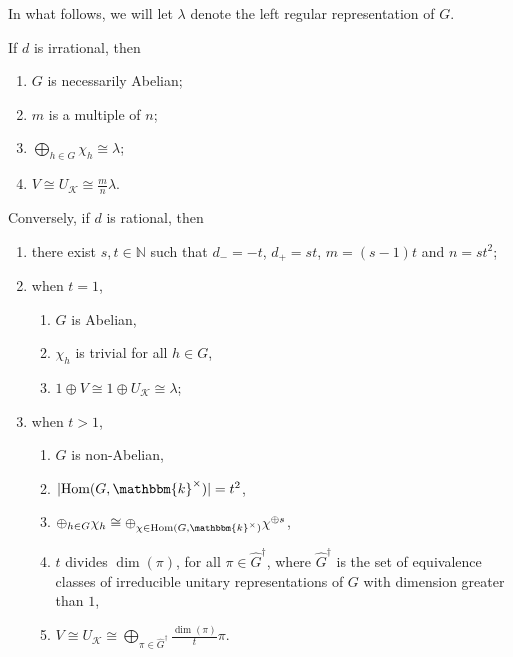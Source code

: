 \noindent In what follows, we will let $\lambda$ denote the left regular representation of $G$.\\

\noindent\begin{theorem}\label{GroupProperties} If ${d}$ is irrational, then
\begin{enumerate}[label=\textup{(\roman*).}, ref=\textup{(\roman*)}, leftmargin=4\parindent]
\item $G$ is necessarily Abelian;
\item $m$ is a multiple of $n$;
\item $\bigoplus_{h \in G} \chi_h \cong \lambda$;
\item $V \cong U_\mathcal{K} \cong \frac{m}{n}\lambda$.
\end{enumerate}
\noindent Conversely, if ${d}$ is rational, then
\begin{enumerate}[label=\textup{(\roman*).}, ref=\textup{(\roman*)}, leftmargin=4\parindent]
\item there exist $s, t \in \mathbb{N}$ such that $d_- = -t$, $d_+ = st$, $m = (s - 1)t$ and $n = st^2$;
\item when $t = 1$,
\begin{enumerate}[label=$\bullet$, leftmargin=4\parindent]
\item $G$ is Abelian,
\item $\chi_h$ is trivial for all $h \in G$,
\item $1 \oplus V \cong 1 \oplus U_\mathcal{K} \cong \lambda$;
\end{enumerate}
\item when $t > 1$,
\begin{enumerate}[label=$\bullet$, leftmargin=4\parindent]
\item $G$ is non-Abelian,
\item $\abs{\homset(G, \mathbbm{k}^\times)} = t^2$,
\item $\oplus_{h \in G} \chi_h \cong \oplus_{\chi \in \homset(G, \mathbbm{k}^\times)} \chi^{\oplus s}$,
\item $t$ divides $\dim(\pi)$, for all $\pi \in \hat{G}^\dagger$, where $\hat{G}^\dagger$ is the set of equivalence classes of irreducible unitary representations of $G$ with dimension greater than $1$,
\item $V \cong U_\mathcal{K} \cong \bigoplus_{\pi\in\hat{G}^\dagger}\frac{\dim(\pi)}{t}\pi$.\\
\end{enumerate}
\end{enumerate}
\end{theorem}

